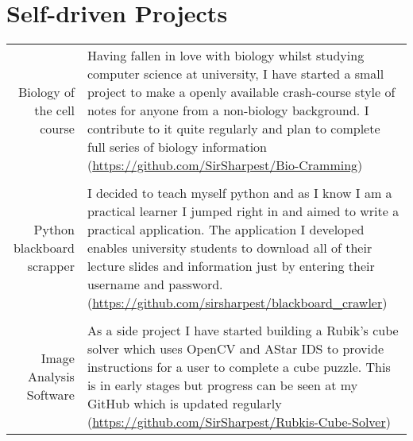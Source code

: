 \documentclass[a4paper,10pt]{article}
\begin{document}
\section{Self-driven Projects}

\begin{tabular}{r|p{11cm}}

  Biology of the cell course & Having fallen in love with biology whilst studying computer science at university, I have started a small project to make a openly available crash-course style of notes for anyone from a non-biology background. I contribute to it quite regularly and plan to complete full series of biology information (\href{https://github.com/SirSharpest/Bio-Cramming}{https://github.com/SirSharpest/Bio-Cramming})\\
  \\
  Python blackboard scrapper& I decided to teach myself python and as I know I am a practical learner I jumped right in and aimed to write a practical application. The application I developed enables university students to download all of their lecture slides and information just by entering their username and password.(\href{https://github.com/sirsharpest/blackboard\_crawler}{https://github.com/sirsharpest/blackboard\_crawler})\\
  \\
  Image Analysis Software& As a side project I have started building a Rubik's cube solver which uses OpenCV and AStar IDS to provide instructions for a user to complete a cube puzzle. This is in early stages but progress can be seen at my GitHub which is updated regularly (\href{https://github.com/SirSharpest/Rubkis-Cube-Solver}{https://github.com/SirSharpest/Rubkis-Cube-Solver})
\end{tabular}
\par 
\clearpage
\end{document}
